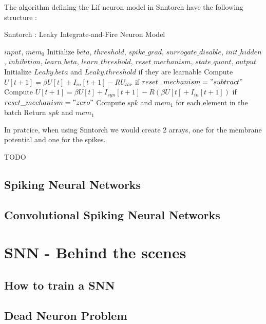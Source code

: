 \documentclass[11pt]{article}
\begin{document}
The algorithm defining the Lif neuron model in Snntorch have the following structure :
\begin{algorithm}
  \caption{Snntorch : Leaky Integrate-and-Fire Neuron Model}
  \begin{algorithmic}[1]
    \Require $input$, $mem_0$
    \State Initialize $beta$, $threshold$, $spike\_grad$, $surrogate\_disable$, $init\_hidden$, $inhibition$, $learn\_beta$, $learn\_threshold$, $reset\_mechanism$, $state\_quant$, $output$
    \State Initialize $Leaky.beta$ and $Leaky.threshold$ if they are learnable
    \EndIf
    \State Compute $U[t+1] = \beta U[t] + I_{in}[t+1] - RU_{thr}$ if $reset\_mechanism = "subtract"$
    \State Compute $U[t+1] = \beta U[t] + I_{syn}[t+1] - R(\beta U[t] + I_{in}[t+1])$ if $reset\_mechanism = "zero"$
    \State Compute $spk$ and $mem_1$ for each element in the batch
    \State Return $spk$ and $mem_1$
    \EndFor
  \end{algorithmic}
\end{algorithm}

In pratcice, when using Snntorch we would create 2 arrays, one for the membrane potential and one for the spikes.

TODO

\subsection{Spiking Neural Networks}

\subsection{Convolutional Spiking Neural Networks}

\pagebreak

\section{SNN - Behind the scenes}

\subsection{How to train a SNN}

\subsection{Dead Neuron Problem}
\end{document}
